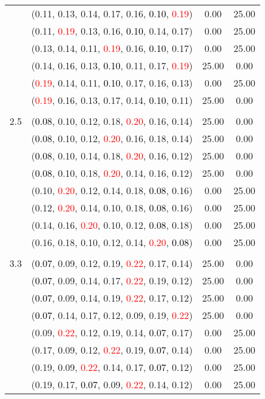\documentclass[10pt,a4paper]{report}
\begin{document}
\begin{center}
\begin{longtable}{clcc}
			&(0.11, 0.13, 0.14, 0.17, 0.16, \textcolor{black}{0.10}, \textcolor{red}{0.19})&0.00&25.00\\
			&(0.11, \textcolor{red}{0.19}, 0.13, 0.16, \textcolor{black}{0.10}, 0.14, 0.17)&0.00&25.00\\
			&(0.13, 0.14, 0.11, \textcolor{red}{0.19}, 0.16, \textcolor{black}{0.10}, 0.17)&0.00&25.00\\
			&(0.14, 0.16, 0.13, \textcolor{black}{0.10}, 0.11, 0.17, \textcolor{red}{0.19})&25.00&0.00\\
			&(\textcolor{red}{0.19}, 0.14, 0.11, \textcolor{black}{0.10}, 0.17, 0.16, 0.13)&0.00&25.00\\
			&(\textcolor{red}{0.19}, 0.16, 0.13, 0.17, 0.14, \textcolor{black}{0.10}, 0.11)&25.00&0.00\\
		&&&\\
		2.5			&(\textcolor{black}{0.08}, 0.10, 0.12, 0.18, \textcolor{red}{0.20}, 0.16, 0.14)&25.00&0.00\\
			&(\textcolor{black}{0.08}, 0.10, 0.12, \textcolor{red}{0.20}, 0.16, 0.18, 0.14)&25.00&0.00\\
			&(\textcolor{black}{0.08}, 0.10, 0.14, 0.18, \textcolor{red}{0.20}, 0.16, 0.12)&25.00&0.00\\
			&(\textcolor{black}{0.08}, 0.10, 0.18, \textcolor{red}{0.20}, 0.14, 0.16, 0.12)&25.00&0.00\\
			&(0.10, \textcolor{red}{0.20}, 0.12, 0.14, 0.18, \textcolor{black}{0.08}, 0.16)&0.00&25.00\\
			&(0.12, \textcolor{red}{0.20}, 0.14, 0.10, 0.18, \textcolor{black}{0.08}, 0.16)&0.00&25.00\\
			&(0.14, 0.16, \textcolor{red}{0.20}, 0.10, 0.12, \textcolor{black}{0.08}, 0.18)&0.00&25.00\\
			&(0.16, 0.18, 0.10, 0.12, 0.14, \textcolor{red}{0.20}, \textcolor{black}{0.08})&0.00&25.00\\
		&&&\\
		3.3			&(\textcolor{black}{0.07}, 0.09, 0.12, 0.19, \textcolor{red}{0.22}, 0.17, 0.14)&25.00&0.00\\
			&(\textcolor{black}{0.07}, 0.09, 0.14, 0.17, \textcolor{red}{0.22}, 0.19, 0.12)&25.00&0.00\\
			&(\textcolor{black}{0.07}, 0.09, 0.14, 0.19, \textcolor{red}{0.22}, 0.17, 0.12)&25.00&0.00\\
			&(\textcolor{black}{0.07}, 0.14, 0.17, 0.12, 0.09, 0.19, \textcolor{red}{0.22})&25.00&0.00\\
			&(0.09, \textcolor{red}{0.22}, 0.12, 0.19, 0.14, \textcolor{black}{0.07}, 0.17)&0.00&25.00\\
			&(0.17, 0.09, 0.12, \textcolor{red}{0.22}, 0.19, \textcolor{black}{0.07}, 0.14)&0.00&25.00\\
			&(0.19, 0.09, \textcolor{red}{0.22}, 0.14, 0.17, \textcolor{black}{0.07}, 0.12)&0.00&25.00\\
			&(0.19, 0.17, \textcolor{black}{0.07}, 0.09, \textcolor{red}{0.22}, 0.14, 0.12)&0.00&25.00\\
		\bottomrule
	\end{longtable}
\end{center}
\end{document}

